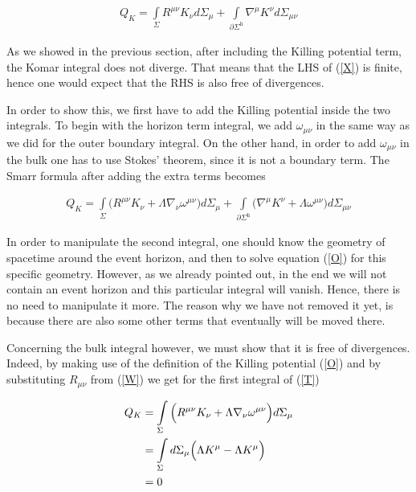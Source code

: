 \documentclass[a4paper,notitlepage]{report}
\begin{document}
\begin{align} \label{X}
Q_{K} =\int\limits_{\Sigma} R^{\mu\nu} K_\nu d\Sigma_{\mu} + \int\limits_{\partial \Sigma^{\text{h}}} \nabla^{\mu} K^{\nu} d\Sigma_{\mu\nu}
\end{align}

\vspace{0.5em}
As we showed in the previous section, after including the Killing potential term, the Komar integral does not diverge. That means that the LHS of (\ref{X}) is finite, hence one would expect that the RHS is also free of divergences.

In order to show this, we first have to add the Killing potential inside the two integrals. To begin with the horizon term integral, we add $\omega_{\mu\nu}$ in the same way as we did for the outer boundary integral.  On the other hand, in order to add $\omega_{\mu\nu}$ in the bulk one has to use Stokes' theorem, since it is not a boundary term. The Smarr formula after adding the extra terms becomes

\begin{align} \label{T}
Q_{K} = \int\limits_{\Sigma} \Big( R^{\mu\nu} K_\nu + \Lambda \nabla_\nu \omega^{\mu\nu} \Big) d\Sigma_{\mu} + \int\limits_{\partial \Sigma^{\text{h}}} \Big( \nabla^{\mu} K^{\nu} + \Lambda \omega^{\mu\nu} \Big) d\Sigma_{\mu\nu}
\end{align}

\vspace{0.5em}
In order to manipulate the second integral, one should know the geometry of spacetime around the event horizon, and then to solve equation (\ref{O}) for this specific geometry. However, as we already pointed out, in the end we will not contain an event horizon and this particular integral will vanish. Hence, there is no need to manipulate it more. The reason why we have not removed it yet, is because there are also some other terms that eventually will be moved there.

Concerning the bulk integral however, we must show that it is free of divergences. Indeed, by making use of the definition of the Killing potential (\ref{O}) and by substituting $R_{\mu\nu}$ from (\ref{W}) we get for the first integral of (\ref{T})

\begin{align}
Q_K &= \int\limits_{\Sigma} \Big( R^{\mu\nu} K_\nu + \Lambda \nabla_\nu \omega^{\mu\nu} \Big) d\Sigma_{\mu} \notag\\
&= \int\limits_{\Sigma} d\Sigma_{\mu} \Big( \Lambda K^\mu - \Lambda K^\mu \Big) \notag \\
&= 0 
\end{align}
\end{document}
